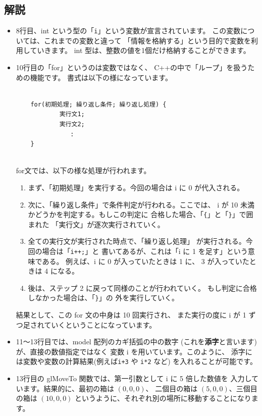 \subsection*{解説}
\begin{itemize}
 \item 8行目、int という型の「\verb+i+」という変数が宣言されています。
	この変数については、これまでの変数と違って
	「情報を格納する」という目的で変数を利用していきます。
	int 型は、整数の値を1個だけ格納することができます。

 \item 10行目の「for」というのは変数ではなく、
	C++の中で「ループ」を扱うための機能です。
	書式は以下の様になっています。\\ ~ \\
	\begin{shadebox}
	\begin{verbatim}
	for(初期処理; 繰り返し条件; 繰り返し処理) {
	        実行文1;
	        実行文2;
	           :
	}
	\end{verbatim}
	\end{shadebox} ~ \\
	for文では、以下の様な処理が行われます。
	\begin{enumerate}
	\item まず、「初期処理」を実行する。今回の場合は
		i に 0 が代入される。
	\item 次に、「繰り返し条件」で条件判定が行われる。ここでは、
		i が 10 未満かどうかを判定する。もしこの判定に
		合格した場合、「\verb+{+」と「\verb+}+」で囲まれた
		「実行文」が逐次実行されていく。
	\item 全ての実行文が実行された時点で、「繰り返し処理」
		が実行される。今回の場合は「\verb-i++;-」と
		書いてあるが、これは「i に 1 を足す」という意味である。
		例えば、i に 0 が入っていたときは 1 に、
		3 が入っていたときは 4 になる。
	\item 後は、ステップ 2 に戻って同様のことが行われていく。
		もし判定に合格しなかった場合は、「\verb+}+」の
		外を実行していく。
	\end{enumerate}
	結果として、この for 文の中身は 10 回実行され、
	また実行の度に i が 1 ずつ足されていくということになっています。

 \item 11〜13行目では、model 配列のカギ括弧の中の数字
	(これを\textbf{添字}と言います)が、直接の数値指定ではなく
	変数 i を用いています。このように、
	添字には変数や変数の計算結果(例えば\verb-i+3- や \verb+i*2+ など)
	を入れることが可能です。

 \item 13行目の glMoveTo 関数では、第一引数として i に 5 倍した数値を
	入力しています。結果的に、最初の箱は \((0, 0, 0)\)、
	二個目の箱は \((5, 0, 0)\)、三個目の箱は \((10, 0, 0)\)
	というように、それぞれ別の場所に移動することになります。

\end{itemize}
\newpage
